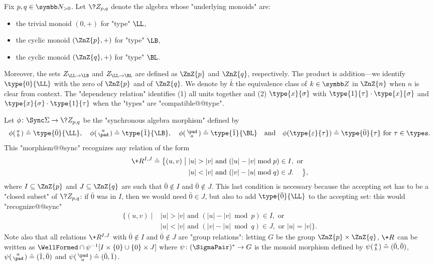 \begin{example}
	\AP\label{ex:algebra-Zpq}
	Fix $p,q \in \N_{>0}$. Let $\?Z_{p,q}$ denote the algebra whose "underlying monoids" are:
	\begin{itemize}
		\item the trivial monoid $(0,+)$ for "type" $\LL$,
		\item the cyclic monoid $(\ZnZ{p},+)$ for "type" $\LB$,
		\item the cyclic monoid $(\ZnZ{q},+)$ for "type" $\BL$.
	\end{itemize}
	Moreover, the sets $Z_{\LL\to\LB}$ and $Z_{\LL\to\BL}$ are defined
	as $\ZnZ{p}$ and $\ZnZ{q}$, respectively.
	The product is addition---we identify $\type{0}{\LL}$ with the zero of $\ZnZ{p}$ and
	of $\ZnZ{q}$. We denote by $\bar k$ the equivalence class of $k\in \Z$ in
	$\ZnZ{n}$ when $n$ is clear from context.
	The "dependency relation" identifies (1) all units together and (2) $\type{x}{\sigma}$ with $\type{1}{\tau} \cdot \type{x}{\sigma}$ and $\type{x}{\sigma} \cdot \type{1}{\tau}$ when the "types" are "compatible@@type".
	
	Let $\phi\colon \Sync\Sigma \to \?Z_{p,q}$ be the "synchronous algebra morphism"
	defined by
	\[
		\phi \pair{a}{b} \defeq  \type{\bar 0}{\LL}, 
		\quad
		\phi \pair{a}{\pad} \defeq \type{\bar 1}{\LB},
		\quad
		\phi \pair{\pad}{a} \defeq \type{\bar 1}{\BL}
		\quad\text{and}\quad
		\phi(\type{\varepsilon}{\tau}) \defeq \type{\bar 0}{\tau}
		\text{ for $\tau \in \types$}.
	\]
	This "morphism@@sync" recognizes any relation of the form 
	\begin{align*}
		\+R^{I,J} \defeq \big\{
			(u,v) \;\big\vert\; & |u| > |v| \text{ and } (|u| - |v| \bmod{p}) \in I, \text{ or} \\
			& |u| < |v| \text{ and } (|v| - |u| \bmod{q}) \in J.
		\hphantom{\text{ or}}\big\},
	\end{align*}
	where $I \subseteq \ZnZ{p}$ and $J \subseteq \ZnZ{q}$ are such that $\bar 0 \not\in I$
	and $\bar 0 \not\in J$. This last condition is necessary because the accepting set
	has to be a "closed subset" of $\?Z_{p,q}$: if $\bar 0$ was in $I$, then we would need
	$\bar 0 \in J$, but also to add $\type{\bar 0}{\LL}$ to the accepting set: this would "recognize@@sync"
	\begin{align*}
		\big\{
			(u,v) \;\big\vert\; & |u| > |v| \text{ and } (|u| - |v| \bmod{p}) \in I, \text{ or} \\
			& |u| < |v| \text{ and } (|v| - |u| \bmod{q}) \in J, \text{ or } |u| = |v| \big\}.
	\end{align*}
	Note also that all relations $\+R^{I,J}$ with $\bar 0 \not\in I$
	and $\bar 0 \not\in J$ are "group relations": letting $G$ be the group $\ZnZ{p} \times \ZnZ{q}$,
	$\+R$ can be written as $\WellFormed\cap \psi^{-1}[I \times \{0\} \cup \{0\} \times J]$ where $\psi \colon (\SigmaPair)^* \to G$ is the monoid morphism defined by $\psi\pair{a}{b} \defeq 
	(\bar 0, \bar 0)$, $\psi\pair{a}{\pad} \defeq (\bar 1, \bar 0)$ and $\psi\pair{\pad}{a} \defeq
	(\bar 0, \bar 1)$.
\end{example}


